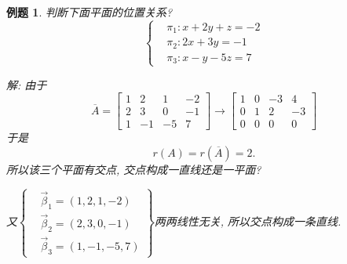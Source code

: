 \documentclass[a4paper]{book}
\newtheorem{eg}{例题}[chapter]
\begin{document}
\begin{eg}
判断下面平面的位置关系?
\begin{displaymath}\left\{\begin{aligned}
&\pi_1:x+2y+z=-2\\
&\pi_2:2x+3y=-1\\
&\pi_3:x-y-5z=7\end{aligned}\right.\end{displaymath}

解: 由于
\begin{displaymath}
\overline{A}=\begin{bmatrix}1&2&1&-2\\2&3&0&-1\\1&-1&-5&7\end{bmatrix}\rightarrow\begin{bmatrix}
1&0&-3&4\\0&1&2&-3\\0&0&0&0\end{bmatrix}\end{displaymath}
于是$$r(A)=r(\overline{A})=2.$$
所以该三个平面有交点, 交点构成一直线还是一平面?

又$\left\{\begin{aligned}&\vec{\beta}_1=(1,2,1,-2)\\&\vec{\beta}_2=(2,3,0,-1)\\&
\vec{\beta}_3=(1,-1,-5,7)\end{aligned}\right\}$两两线性无关, 所以交点构成一条直线.

\end{eg}
\end{document}
